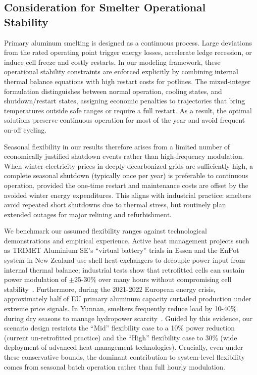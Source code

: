 \documentclass[preprint,12pt]{elsarticle}
\begin{document}
\subsection{Consideration for Smelter Operational Stability}\label{sec:stability}

Primary aluminum smelting is designed as a continuous process. Large deviations from the rated operating point trigger energy losses, accelerate ledge recession, or induce cell freeze and costly restarts. In our modeling framework, these operational stability constraints are enforced explicitly by combining internal thermal balance equations with high restart costs for potlines. The mixed-integer formulation distinguishes between normal operation, cooling states, and shutdown/restart states, assigning economic penalties to trajectories that bring temperatures outside safe ranges or require a full restart. As a result, the optimal solutions preserve continuous operation for most of the year and avoid frequent on-off cycling.

Seasonal flexibility in our results therefore arises from a limited number of economically justified shutdown events rather than high-frequency modulation. When winter electricity prices in deeply decarbonized grids are sufficiently high, a complete seasonal shutdown (typically once per year) is preferable to continuous operation, provided the one-time restart and maintenance costs are offset by the avoided winter energy expenditures. This aligns with industrial practice: smelters avoid repeated short shutdowns due to thermal stress, but routinely plan extended outages for major relining and refurbishment. 

We benchmark our assumed flexibility ranges against technological demonstrations and empirical experience. Active heat management projects such as TRIMET Aluminium SE's “virtual battery” trials in Essen and the EnPot system in New Zealand use shell heat exchangers to decouple power input from internal thermal balance; industrial tests show that retrofitted cells can sustain power modulation of $\pm$25-30\% over many hours without compromising cell stability~\citep{lukin_reduction_2016, enpot_2026}. Furthermore, during the 2021-2022 European energy crisis, approximately half of EU primary aluminum capacity curtailed production under extreme price signals. In Yunnan, smelters frequently reduce load by 10-40\% during dry seasons to manage hydropower scarcity~\citep{european_aluminum_crisis_2022, alcircle_yunnan_cuts_2023, smm_yunnan_cuts_2024}. Guided by this evidence, our scenario design restricts the “Mid” flexibility case to a 10\% power reduction (current un-retrofitted practice) and the ``High'' flexibility case to 30\% (wide deployment of advanced heat-management technologies). Crucially, even under these conservative bounds, the dominant contribution to system-level flexibility comes from seasonal batch operation rather than full hourly modulation.
\end{document}
